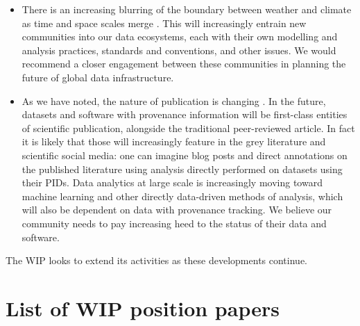 \documentclass[gmd,manuscript]{copernicus}
\newcommand{\pipref}[1] {\citep{ref:#1}}
\begin{document}
\begin{itemize}
\item There is an increasing blurring of the boundary between weather
  and climate as time and space scales merge \pipref{hoskins2013}.
  This will increasingly entrain new communities into our data
  ecosystems, each with their own modelling and analysis practices,
  standards and conventions, and other issues. We would recommend a
  closer engagement between these communities in planning the future
  of global data infrastructure.
\item As we have noted, the nature of publication is changing
  \citep[see e.g][]{ref:davidetal2016}. In the future, datasets and
  software with provenance information will be first-class entities of
  scientific publication, alongside the traditional peer-reviewed
  article. In fact it is likely that those will increasingly feature
  in the grey literature and scientific social media: one can imagine
  blog posts and direct annotations on the published literature using
  analysis directly performed on datasets using their PIDs. Data
  analytics at large scale is increasingly moving toward machine
  learning and other directly data-driven methods of analysis, which
  will also be dependent on data with provenance tracking. We believe our
  community needs to pay increasing heed to the status of their data
  and software.
\end{itemize}

The WIP looks to extend its activities as these developments continue.

\appendix

\section{List of WIP position papers}
\label{sec:wip}
\end{document}
